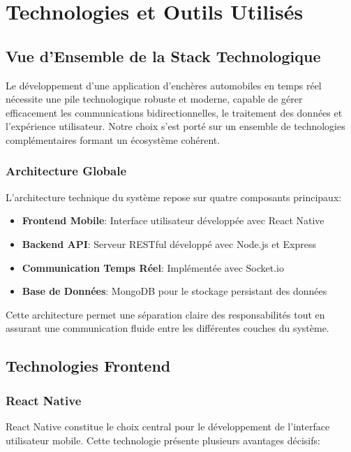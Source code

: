 \chapter{Technologies et Outils Utilisés}

\section{Vue d'Ensemble de la Stack Technologique}

Le développement d'une application d'enchères automobiles en temps réel nécessite une pile technologique robuste et moderne, capable de gérer efficacement les communications bidirectionnelles, le traitement des données et l'expérience utilisateur. Notre choix s'est porté sur un ensemble de technologies complémentaires formant un écosystème cohérent.

\subsection{Architecture Globale}

L'architecture technique du système repose sur quatre composants principaux:

\begin{itemize}
    \item \textbf{Frontend Mobile}: Interface utilisateur développée avec React Native
    \item \textbf{Backend API}: Serveur RESTful développé avec Node.js et Express
    \item \textbf{Communication Temps Réel}: Implémentée avec Socket.io
    \item \textbf{Base de Données}: MongoDB pour le stockage persistant des données
\end{itemize}

Cette architecture permet une séparation claire des responsabilités tout en assurant une communication fluide entre les différentes couches du système.

\section{Technologies Frontend}

\subsection{React Native}

React Native constitue le choix central pour le développement de l'interface utilisateur mobile. Cette technologie présente plusieurs avantages décisifs:

